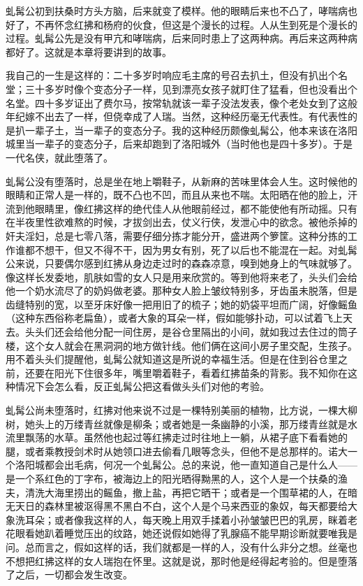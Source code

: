 虬髯公初到扶桑时方头方脑，后来就变了模样。他的眼睛后来也不凸了，哮喘病也好了，不再怀念红拂和杨府的伙食，但这是个漫长的过程。人从生到死是个漫长的过程。虬髯公先是没有甲亢和哮喘病，后来同时患上了这两种病。再后来这两种病都好了。这就是本章将要讲到的故事。 

我自己的一生是这样的：二十多岁时响应毛主席的号召去扒土，但没有扒出个名堂；三十多岁时像个变态分子一样，见到漂亮女孩子就盯住了猛看，但也没看出个名堂。四十多岁证出了费尔马，按常轨就该一辈子没法发表，像个老处女到了这般年纪嫁不出去了一样，但侥幸成了人瑞。当然，这种经历毫无代表性。有代表性的是扒一辈子土，当一辈子的变态分子。我的这种经历颇像虬髯公，他本来该在洛阳城里当一辈子的变态分子，后来却跑到了洛阳城外（当时他也是四十多岁）。于是一代名侠，就此堕落了。 

虬髯公没有堕落时，总是坐在地上嚼鞋子，从新麻的苦味里体会人生。这时候他的眼睛和正常人是一样的，既不凸也不凹，而且从来也不喘。太阳晒在他的脸上，汗流到他眼睛里，像红拂这样的绝代佳人从他眼前经过，都不能使他有所动摇。只有在半夜里性欲难熬的时候，才拔剑出去，仗义行侠，发泄心中的欲念。被他杀掉的奸夫淫妇，总是七零八落，需要仔细分拣才能分开，盛进两个箩筐。这种分拣的工作谁都不想干，但又不得不干，因为男女有别，死了以后也不能混在一起。对虬髯公来说，只要偶尔感到红拂从身边走过时的森森凉意，嗅到她身上的气味就够了。像这样长发委地，肌肤如雪的女人只是用来欣赏的。等到他将来老了，头头们会给他一个奶水流尽了的奶妈做老婆。那种女人脸上皱纹特别多，牙齿虽未脱落，但是齿缝特别的宽，以至牙床好像一把用旧了的梳子；她的奶袋平坦而广阔，好像鳐鱼（这种东西俗称老扁鱼），或者大象的耳朵一样，假如能够扑动，可以试着飞上天去。头头们还会给他分配一间住房，是谷仓里隔出的小间，就如我过去住过的筒子楼，这个女人就会在黑洞洞的地方做针线。他们俩在这间小房子里交配，生孩子。用不着头头们提醒他，虬髯公就知道这是所说的幸福生活。但是在住到谷仓里之前，还要在阳光下住很多年，嘴里嚼着鞋子，看着红拂苗条的背影。我不知你在这种情况下会怎么看，反正虬髯公把这看做头头们对他的考验。 

虬髯公尚未堕落时，红拂对他来说不过是一棵特别美丽的植物，比方说，一棵大柳树，她头上的万缕青丝就像是柳条；或者她是一条幽静的小溪，那万缕青丝就是水流里飘荡的水草。虽然他也起过等红拂走过时往地上一躺，从裙子底下看看她的腿，或者乘教授剑术时从她领口进去偷看几眼等念头，但他不是总那样的。诺大一个洛阳城都会出毛病，何况一个虬髯公。总的来说，他一直知道自己是什么人——是一个系红色的丁字布，被海边上的阳光晒得黝黑的人，这个人是一个扶桑的渔夫，清洗大海里捞出的鳐鱼，撤上盐，再把它晒干；或者是一个围草裙的人，在暗无天日的森林里被沤得黑不黑白不白，这个人是个马来西亚的象奴，每天都要给大象洗耳朵；或者像我这样的人，每天晚上用双手揉着小孙皱皱巴巴的乳房，眯着老花眼看她趴着睡觉压出的纹路，她还说假如她得了乳腺癌不能早期诊断就要唯我是问。总而言之，假如这样的话，我们就都是一样的人，没有什么非分之想。丝毫也不想把红拂这样的女人瑞抱在怀里。这就是说，那时他是经得起考验的。但是堕落了之后，一切都会发生改变。 

